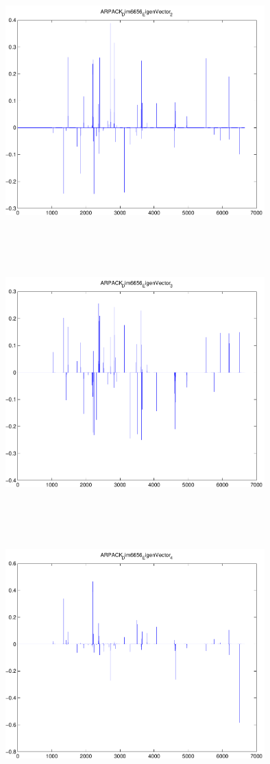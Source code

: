 \documentclass[9pt]{article}
\theoremstyle{plain}
\theoremstyle{definition}
\theoremstyle{remark}
\numberwithin{equation}{section}
\begin{document}
\includegraphics[width=10.0cm,height=10.0cm]{ARPACK_Dim6656_EigenVector_2.pdf}

\includegraphics[width=10.0cm,height=10.0cm]{ARPACK_Dim6656_EigenVector_3.pdf}

\includegraphics[width=10.0cm,height=10.0cm]{ARPACK_Dim6656_EigenVector_4.pdf}
\end{document}
